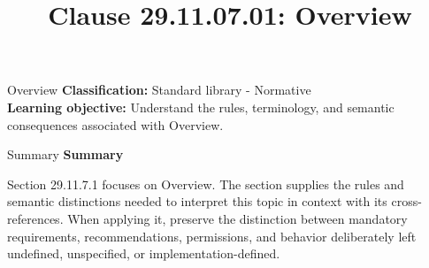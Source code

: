 \documentclass[10pt,letterpaper]{article}
\title{Clause 29.11.07.01: Overview}
\author{}
\date{}
\begin{document}
\maketitle
\begin{CornellOverviewBox}{Overview}
\textbf{Classification:} Standard library - Normative\\[2pt]
\textbf{Learning objective:} Understand the rules, terminology, and semantic consequences associated with Overview.
\end{CornellOverviewBox}\begin{CornellSummaryBox}{Summary}
{\sffamily\bfseries\color{Accent} Summary}\par\vspace{3pt}Section 29.11.7.1 focuses on Overview. The section supplies the rules and semantic distinctions needed to interpret this topic in context with its cross-references. When applying it, preserve the distinction between mandatory requirements, recommendations, permissions, and behavior deliberately left undefined, unspecified, or implementation-defined.
\end{CornellSummaryBox}
\end{document}
